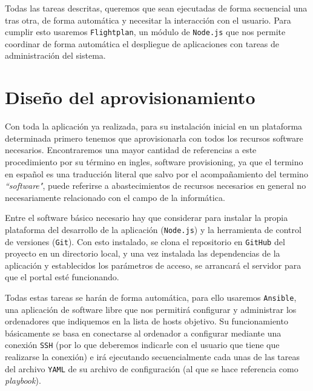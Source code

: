 \bigskip
Todas las tareas descritas, queremos que sean ejecutadas de forma secuencial una tras otra, de forma automática y necesitar la interacción con el usuario. Para cumplir esto usaremos {\tt Flightplan}, un módulo de {\tt Node.js} que nos permite coordinar de forma automática el despliegue de aplicaciones con tareas de administración del sistema.

\newpage
\section{Diseño del aprovisionamiento}

Con toda la aplicación ya realizada, para su instalación inicial en un plataforma determinada primero tenemos que aprovisionarla con todos los recursos software necesarios. Encontraremos una mayor cantidad de referencias a este procedimiento por su término en ingles, software provisioning, ya que el termino en español es una traducción literal que salvo por el acompañamiento del termino \textit{``software"}, puede referirse a abastecimientos de recursos necesarios en general no necesariamente relacionado con el campo de la informática.

\bigskip
Entre el software básico necesario hay que considerar para instalar la propia plataforma del desarrollo de la aplicación ({\tt Node.js}) y la herramienta de control de versiones ({\tt Git}). Con esto instalado, se clona el repositorio en {\tt GitHub} del proyecto en un directorio local, y una vez instalada las dependencias de la aplicación y establecidos los parámetros de acceso, se arrancará el servidor para que el portal esté funcionando.

\bigskip
Todas estas tareas se harán de forma automática, para ello usaremos {\tt Ansible}, una aplicación de software libre que nos permitirá configurar y administrar los ordenadores que indiquemos en la lista de hosts objetivo. Su funcionamiento básicamente se basa en conectarse al ordenador a configurar mediante una conexión {\tt SSH} (por lo que deberemos indicarle con el usuario que tiene que realizarse la conexión) e irá ejecutando secuencialmente cada unas de las tareas del archivo {\tt YAML} de su archivo de configuración (al que se hace referencia como \textit{playbook}).